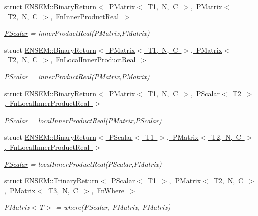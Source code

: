 \begin{DoxyCompactItemize}
struct \mbox{\hyperlink{structENSEM_1_1BinaryReturn_3_01PMatrix_3_01T1_00_01N_00_01C_01_4_00_01PMatrix_3_01T2_00_01N_00_b7141a669b31fb2094aee5e58df04a01}{E\+N\+S\+E\+M\+::\+Binary\+Return$<$ P\+Matrix$<$ T1, N, C $>$, P\+Matrix$<$ T2, N, C $>$, Fn\+Inner\+Product\+Real $>$}}
\begin{DoxyCompactList}\small\item\em \mbox{\hyperlink{classENSEM_1_1PScalar}{P\+Scalar}} = inner\+Product\+Real(\+P\+Matrix,\+P\+Matrix) \end{DoxyCompactList}\item 
struct \mbox{\hyperlink{structENSEM_1_1BinaryReturn_3_01PMatrix_3_01T1_00_01N_00_01C_01_4_00_01PMatrix_3_01T2_00_01N_00_c0701524dc0f1159f2f6c12312f494be}{E\+N\+S\+E\+M\+::\+Binary\+Return$<$ P\+Matrix$<$ T1, N, C $>$, P\+Matrix$<$ T2, N, C $>$, Fn\+Local\+Inner\+Product\+Real $>$}}
\begin{DoxyCompactList}\small\item\em \mbox{\hyperlink{classENSEM_1_1PScalar}{P\+Scalar}} = inner\+Product\+Real(\+P\+Matrix,\+P\+Matrix) \end{DoxyCompactList}\item 
struct \mbox{\hyperlink{structENSEM_1_1BinaryReturn_3_01PMatrix_3_01T1_00_01N_00_01C_01_4_00_01PScalar_3_01T2_01_4_00_01FnLocalInnerProductReal_01_4}{E\+N\+S\+E\+M\+::\+Binary\+Return$<$ P\+Matrix$<$ T1, N, C $>$, P\+Scalar$<$ T2 $>$, Fn\+Local\+Inner\+Product\+Real $>$}}
\begin{DoxyCompactList}\small\item\em \mbox{\hyperlink{classENSEM_1_1PScalar}{P\+Scalar}} = local\+Inner\+Product\+Real(\+P\+Matrix,\+P\+Scalar) \end{DoxyCompactList}\item 
struct \mbox{\hyperlink{structENSEM_1_1BinaryReturn_3_01PScalar_3_01T1_01_4_00_01PMatrix_3_01T2_00_01N_00_01C_01_4_00_01FnLocalInnerProductReal_01_4}{E\+N\+S\+E\+M\+::\+Binary\+Return$<$ P\+Scalar$<$ T1 $>$, P\+Matrix$<$ T2, N, C $>$, Fn\+Local\+Inner\+Product\+Real $>$}}
\begin{DoxyCompactList}\small\item\em \mbox{\hyperlink{classENSEM_1_1PScalar}{P\+Scalar}} = local\+Inner\+Product\+Real(\+P\+Scalar,\+P\+Matrix) \end{DoxyCompactList}\item 
struct \mbox{\hyperlink{structENSEM_1_1TrinaryReturn_3_01PScalar_3_01T1_01_4_00_01PMatrix_3_01T2_00_01N_00_01C_01_4_00_0f44c172914945b9c1c722e99398bb914}{E\+N\+S\+E\+M\+::\+Trinary\+Return$<$ P\+Scalar$<$ T1 $>$, P\+Matrix$<$ T2, N, C $>$, P\+Matrix$<$ T3, N, C $>$, Fn\+Where $>$}}
\begin{DoxyCompactList}\small\item\em P\+Matrix$<$\+T$>$ = where(\+P\+Scalar, P\+Matrix, P\+Matrix) \end{DoxyCompactList}\end{DoxyCompactItemize}

